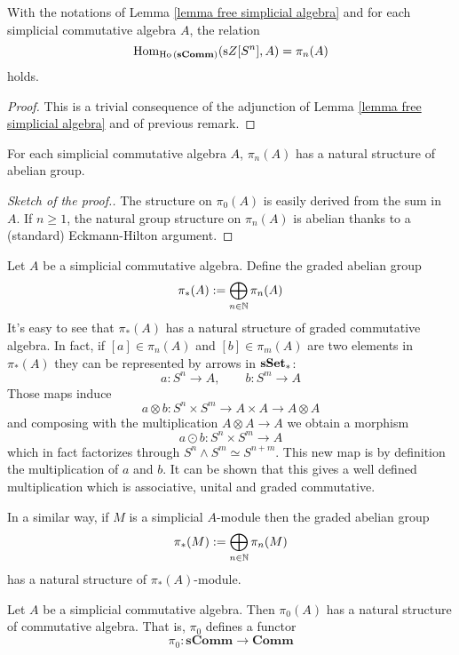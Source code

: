 \begin{refsection}
\begin{lemma}
With the notations of Lemma \ref{lemma free simplicial algebra} and for each simplicial commutative algebra $A$, the relation
\[
\mathrm{Hom}_{\operatorname{\mathrm{Ho} \,}(\mathbf{sComm})}(\mathrm s Z[S^n], A) = \pi_n(A)
\]
holds.
\end{lemma}

\begin{proof}
This is a trivial consequence of the adjunction of Lemma \ref{lemma free simplicial algebra} and of previous remark.
\end{proof}

\begin{lemma}
For each simplicial commutative algebra $A$, $\pi_n(A)$ has a natural structure of abelian group.
\end{lemma}

\begin{proof}[Sketch of the proof.]
The structure on $\pi_0(A)$ is easily derived from the sum in $A$. If $n \ge 1$, the natural group structure on $\pi_n(A)$ is abelian thanks to a (standard) Eckmann-Hilton argument.
\end{proof}

Let $A$ be a simplicial commutative algebra. Define the graded abelian group
\[
\pi_*(A) := \bigoplus_{n \in \mathbb{N}} \pi_n(A)
\]
It's easy to see that $\pi_*(A)$ has a natural structure of graded commutative algebra. In fact, if $[a] \in \pi_n(A)$ and $[b] \in \pi_m(A)$ are two elements in $\pi_*(A)$ they can be represented by arrows in $\mathbf{sSet}_*$:
\[
a \colon S^n \to A, \qquad b \colon S^m \to A
\]
Those maps induce
\[
a \otimes b \colon S^n \times S^m \to A \times A \to A \otimes A
\]
and composing with the multiplication $A \otimes A \to A$ we obtain a morphism
\[
a \odot b \colon S^n \times S^m \to A
\]
which in fact factorizes through $S^n \wedge S^m \simeq S^{n+m}$. This new map is by definition the multiplication of $a$ and $b$. It can be shown that this gives a well defined multiplication which is associative, unital and graded commutative.

In a similar way, if $M$ is a simplicial $A$-module then the graded abelian group
\[
\pi_*(M) := \bigoplus_{n \in \mathbb{N}} \pi_n(M)
\]
has a natural structure of $\pi_*(A)$-module.

\begin{cor} \label{cor pi_0}
Let $A$ be a simplicial commutative algebra. Then $\pi_0(A)$ has a natural structure of commutative algebra. That is, $\pi_0$ defines a functor
\[
\pi_0 \colon \mathbf{sComm} \to \mathbf{Comm}
\]
\end{cor}


\end{refsection}
